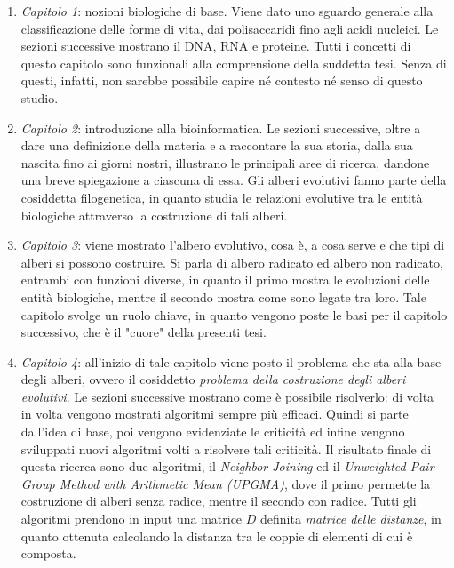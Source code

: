 \begin{enumerate}
	\item \textit{Capitolo 1}: nozioni biologiche di base. Viene dato uno sguardo generale alla classificazione delle forme di vita, dai polisaccaridi fino agli acidi nucleici. Le sezioni successive mostrano il DNA, RNA e proteine. Tutti i concetti di questo capitolo sono funzionali alla comprensione della suddetta tesi. Senza di questi, infatti, non sarebbe possibile capire né contesto né senso di questo studio.
	\item \textit{Capitolo 2}: introduzione alla bioinformatica. Le sezioni successive, oltre a dare una definizione della materia e a raccontare la sua storia, dalla sua nascita fino ai giorni nostri, illustrano le principali aree di ricerca, dandone una breve spiegazione a ciascuna di essa.
	\newline
	Gli alberi evolutivi fanno parte della cosiddetta filogenetica, in quanto studia le relazioni evolutive tra le entità biologiche attraverso la costruzione di tali alberi.
	\item \textit{Capitolo 3}: viene mostrato l'albero evolutivo, cosa è, a cosa serve e che tipi di alberi si possono costruire. Si parla di albero radicato ed albero non radicato, entrambi con funzioni diverse, in quanto il primo mostra le evoluzioni delle entità biologiche, mentre il secondo mostra come sono legate tra loro. Tale capitolo svolge un ruolo chiave, in quanto vengono poste le basi per il capitolo successivo, che è il "cuore" della presenti tesi.
	\item \textit{Capitolo 4}: all'inizio di tale capitolo viene posto il problema che sta alla base degli alberi, ovvero il cosiddetto \textit{problema della costruzione degli alberi evolutivi}. Le sezioni successive mostrano come è possibile risolverlo: di volta in volta vengono mostrati algoritmi sempre più efficaci. Quindi si parte dall'idea di base, poi vengono evidenziate le criticità ed infine vengono sviluppati nuovi algoritmi volti a risolvere tali criticità. Il risultato finale di questa ricerca sono due algoritmi, il \textit{Neighbor-Joining} ed il \textit{Unweighted Pair Group Method with Arithmetic Mean (UPGMA)}, dove il primo permette la costruzione di alberi senza radice, mentre il secondo con radice.
	\newline
	Tutti gli algoritmi prendono in input una matrice $D$ definita \textit{matrice delle distanze}, in quanto ottenuta calcolando la distanza tra le coppie di elementi di cui è composta.
\end{enumerate}

